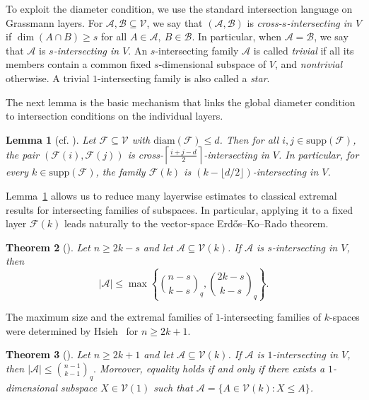 \documentclass[11pt]{article}
\newtheorem{theorem}{Theorem}[section]
\newtheorem{lemma}[theorem]{Lemma}
\theoremstyle{definition}
\newcommand{\qbinom}[2]{\genfrac{(}{)}{0pt}{}{#1}{#2}_q}
\newcommand{\diam}{\mathrm{diam}}
\newcommand{\supp}{\mathrm{supp}}
\begin{document}
To exploit the diameter condition, we use the standard intersection language on Grassmann layers. 
For $\mathcal{A},\mathcal{B}\subseteq\mathcal{V}$, we say that $(\mathcal{A},\mathcal{B})$ is \emph{cross-$s$-intersecting in $V$} if
\(
\dim(A\cap B)\ge s\) for all
\( A\in\mathcal{A},\ B\in\mathcal{B}.
\)
In particular, when $\mathcal{A}=\mathcal{B}$, we say that $\mathcal{A}$ is \emph{$s$-intersecting in $V$}. 
An $s$-intersecting family $\mathcal{A}$ is called \emph{trivial} if all its members contain a common fixed $s$-dimensional subspace of $V$, and \emph{nontrivial} otherwise. 
A trivial $1$-intersecting family is also called a \emph{star}.

The next lemma is the basic mechanism that links the global diameter condition to intersection conditions on the individual layers.

\begin{lemma}[cf. \cite{LLY2026}]\label{lem:intersecting}
Let $\mathcal{F} \subseteq \mathcal{V}$ with $\diam(\mathcal{F}) \le d$. Then for all $i,j\in \supp(\mathcal{F})$, the pair $(\mathcal{F}(i),\mathcal{F}(j))$ is cross-$\left\lceil \frac{i+j-d}{2}\right\rceil$-intersecting in $V$. 
In particular, for every $k\in \supp(\mathcal{F})$, the family $\mathcal{F}(k)$ is $(k-\lfloor d/2\rfloor)$-intersecting in $V$.
\end{lemma}

Lemma~\ref{lem:intersecting} allows us to reduce many layerwise estimates to classical extremal results for intersecting families of subspaces. 
In particular, applying it to a fixed layer $\mathcal{F}(k)$ leads naturally to the vector-space Erd\H{o}s--Ko--Rado theorem.

\begin{theorem}[\cite{FW1986}]\label{thm:ekrvs}
Let $n \ge 2k-s$ and let $\mathcal{A}\subseteq \mathcal{V}(k)$. If $\mathcal{A}$ is $s$-intersecting in $V$, then
\[
|\mathcal{A}|
\le
\max\left\{
\qbinom{n-s}{k-s},
\qbinom{2k-s}{k-s}
\right\}.
\]
\end{theorem}


The maximum size and the extremal families of $1$-intersecting families of $k$-spaces were determined by Hsieh~\cite{H1975} for $n \geq 2k+1$.


\begin{theorem}[\cite{H1975}]\label{thm:EKR-vector-space-1}
Let $n \ge 2k+1$ and let $\mathcal{A} \subseteq \mathcal V(k)$. If $\mathcal{A}$ is $1$-intersecting in $V$, then
\(
|\mathcal{A}| \le \qbinom{n-1}{k-1}.
\)
Moreover, equality holds if and only if there exists a $1$-dimensional subspace $X \in \mathcal V(1)$ such that
$\mathcal{A} = \{A \in \mathcal V(k) : X \le A\}$.
\end{theorem}
\end{document}
